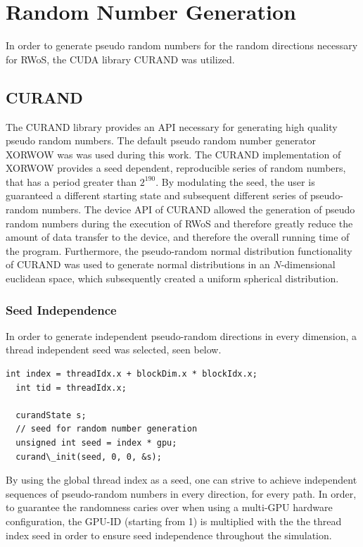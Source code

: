 \section{Random Number Generation}
In order to generate pseudo random numbers for the random directions necessary
for \Gls{RWoS}, the \Gls{CUDA} library \Gls{CURAND} was utilized.
\subsection{CURAND}
The \Gls{CURAND} library provides an API necessary for generating high quality
pseudo random numbers.  The default pseudo random number generator XORWOW was
was used during this work\cite{xorwow}.  The CURAND implementation of XORWOW provides
a seed dependent, reproducible series of random numbers, that has
a period greater than $2^{190}$. By modulating the seed, the user is guaranteed a
different starting state and subsequent different series of pseudo-random numbers.
The device API of \Gls{CURAND} allowed
the generation of pseudo random numbers during the execution of \Gls{RWoS} and
therefore greatly reduce the amount of data transfer to the device, and therefore
the overall running time of the program.  Furthermore, the pseudo-random normal
distribution functionality of \Gls{CURAND} was used to generate normal distributions
in an $N$-dimensional euclidean space, which subsequently created a uniform spherical
distribution.
\subsubsection{Seed Independence}
In order to generate independent pseudo-random directions in every dimension,
a thread independent seed was selected, seen below.
\begin{lstlisting}[caption="Random Number Generation(source:src/wos\_native.cuh see: appendix \ref{appendix})",
  label=Random Number Generation]
  int index = threadIdx.x + blockDim.x * blockIdx.x;
  int tid = threadIdx.x;

  curandState s;
  // seed for random number generation
  unsigned int seed = index * gpu;
  curand\_init(seed, 0, 0, &s);
\end{lstlisting}
By using the global thread index as a seed, one can strive to achieve independent
sequences of pseudo-random numbers in every direction, for every path.  In order,
to guarantee the randomness caries over when using a multi-GPU hardware configuration,
the GPU-ID (starting from 1) is multiplied with the the thread index seed in order
to ensure seed independence throughout the simulation.

